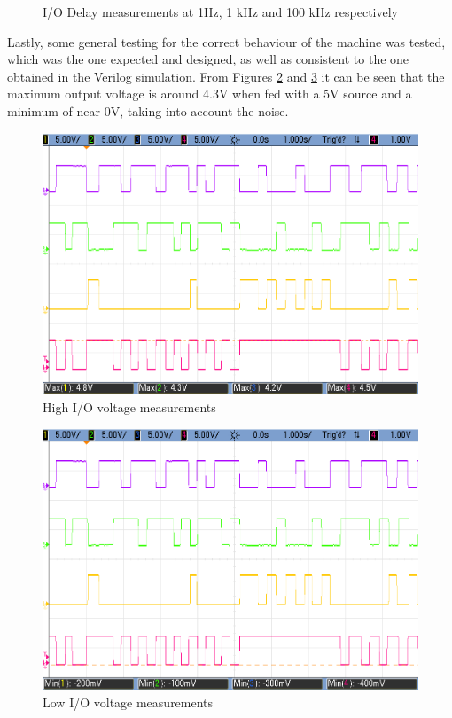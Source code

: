\begin{figure}[H]
\begin{center}
        \caption{I/O Delay measurements at 1Hz, 1 kHz and 100 kHz respectively}
        \label{fig:moore_delays}
    \end{center}
\end{figure}

Lastly, some general testing for the correct behaviour of the machine was tested, which was the one expected and
designed, as well as consistent to the one obtained in the Verilog simulation. From Figures \ref{fig:moore_max} and 
\ref{fig:moore_min} it can be seen that the maximum output voltage is around 4.3V when fed with a 5V source and a
minimum of near 0V, taking into account the noise.

\begin{figure}[H]
    \begin{center}
        \includegraphics[scale=0.3]{../Exercise1/Moore/report/images/e3e1_1s4i_2b1_2b2_v1.png}
        \caption{High I/O voltage measurements}
        \label{fig:moore_max}
    \end{center}
\end{figure}

\begin{figure}[H]
    \begin{center}
        \includegraphics[scale=0.3]{../Exercise1/Moore/report/images/e3e1_1s4i_2b1_2b2_v0.png}
        \caption{Low I/O voltage measurements}
        \label{fig:moore_min}
    \end{center}
\end{figure}

